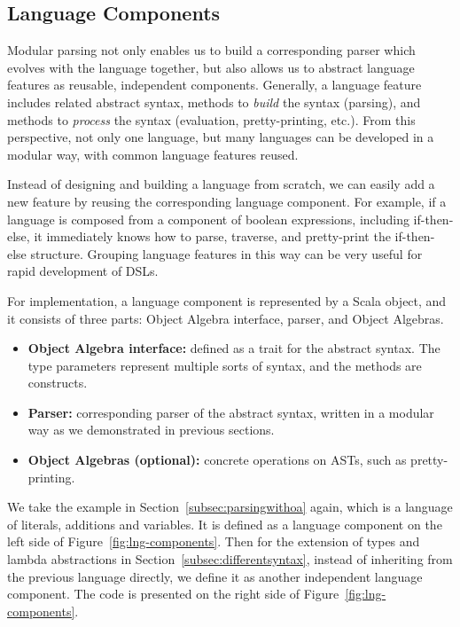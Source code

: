 \subsection{Language Components}\label{subsec:language-component}

Modular parsing not only enables us to build a corresponding parser
which evolves with the language together, but also allows us to
abstract language features as reusable, independent components.
Generally, a language feature includes related abstract syntax,
methods to \textit{build} the syntax (parsing), and methods to
\textit{process} the syntax (evaluation, pretty-printing, etc.). From
this perspective, not only one language, but many languages can be
developed in a modular way, with common language features reused.

Instead of designing and building a language from scratch, we can
easily add a new feature by reusing the corresponding language
component. For example, if a language is composed from a component of
boolean expressions, including if-then-else, it immediately knows how
to parse, traverse, and pretty-print the if-then-else structure.
Grouping language features in this way can
be very useful for rapid development of DSLs.

For implementation, a language component is represented by a Scala object, and it consists of three parts: Object Algebra interface, parser, and Object Algebras.

\begin{itemize}[leftmargin=*]
    \item \textbf{Object Algebra interface:} defined as a trait for the abstract syntax. The type parameters represent multiple sorts of syntax, and the methods are constructs.
    \item \textbf{Parser:} corresponding parser of the abstract syntax, written in a modular way as we demonstrated in previous sections.
    \item \textbf{Object Algebras (optional):} concrete operations on ASTs, such as pretty-printing.
\end{itemize}

We take the example in Section~\ref{subsec:parsingwithoa} again, which is a language of literals, additions and variables. It is defined as a
language component on the left side of Figure~\ref{fig:lng-components}.
Then for the extension of types and lambda abstractions in Section~\ref{subsec:differentsyntax}, instead of inheriting from the previous language directly, we define it as another independent language component. The code is presented on the right side of Figure~\ref{fig:lng-components}.

